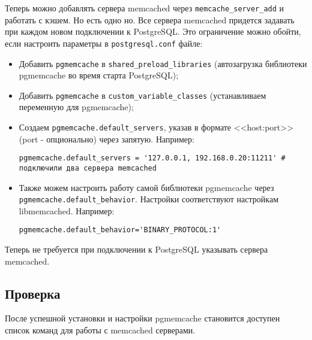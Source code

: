 Теперь можно добавлять сервера memcached через \lstinline!memcache_server_add! и работать с кэшем. Но есть одно но. Все сервера memcached придется задавать при каждом новом подключении к PostgreSQL. Это ограничение можно обойти, если настроить параметры в \lstinline!postgresql.conf! файле:

\begin{itemize}
  \item Добавить \lstinline!pgmemcache! в \lstinline!shared_preload_libraries! (автозагрузка библиотеки pgmemcache во время старта PostgreSQL);
  \item Добавить \lstinline!pgmemcache! в \lstinline!custom_variable_classes! (устанавливаем переменную для pgmemcache);
  \item Создаем \lstinline!pgmemcache.default_servers!, указав в формате <<host:port>> (port - опционально) через запятую. Например:

\begin{lstlisting}[label=lst:pgcache6,caption=Настройка default\_servers]
pgmemcache.default_servers = '127.0.0.1, 192.168.0.20:11211' # подключили два сервера memcached
\end{lstlisting}

\item Также можем настроить работу самой библиотеки pgmemcache через \lstinline!pgmemcache.default_behavior!. Настройки соответствуют настройкам libmemcached. Например:

\begin{lstlisting}[label=lst:pgcache7,caption=Настройка pgmemcache]
pgmemcache.default_behavior='BINARY_PROTOCOL:1'
\end{lstlisting}

\end{itemize}

Теперь не требуется при подключении к PostgreSQL указывать сервера memcached.


\subsection{Проверка}

После успешной установки и настройки pgmemcache становится доступен список команд для работы с memcached серверами.

